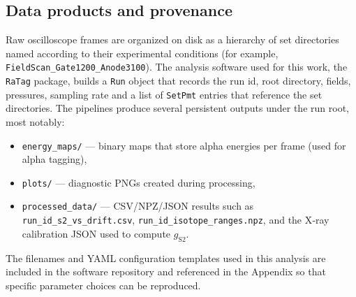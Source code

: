 \subsection{Data products and provenance}
Raw oscilloscope frames are organized on disk as a hierarchy of set directories named according to their experimental conditions (for example, \texttt{FieldScan\_Gate1200\_Anode3100}). The analysis software used for this work, the \texttt{RaTag} package, builds a \texttt{Run} object that records the run id, root directory, fields, pressures, sampling rate and a list of \texttt{SetPmt} entries that reference the set directories. The pipelines produce several persistent outputs under the run root, most notably:
\begin{itemize}
\item \texttt{energy\_maps/} — binary maps that store alpha energies per frame (used for alpha tagging),
\item \texttt{plots/} — diagnostic PNGs created during processing,
\item \texttt{processed\_data/} — CSV/NPZ/JSON results such as \texttt{run\_id\_s2\_vs\_drift.csv}, \texttt{run\_id\_isotope\_ranges.npz}, and the X‑ray calibration JSON used to compute $g_{\mathrm{S2}}$.
\end{itemize}

The filenames and YAML configuration templates used in this analysis are included in the software repository and referenced in the Appendix so that specific parameter choices can be reproduced.
